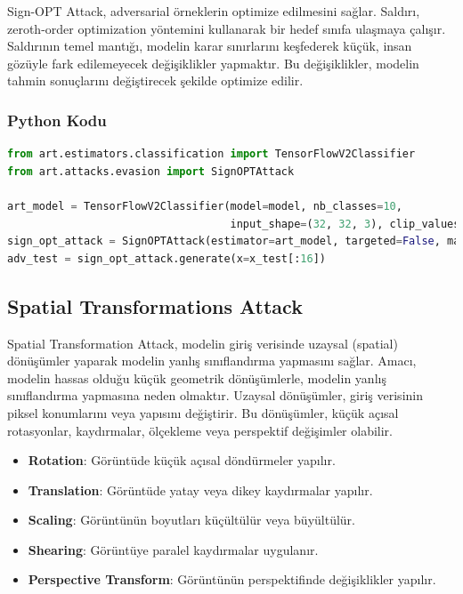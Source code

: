 Sign-OPT Attack, adversarial örneklerin optimize edilmesini sağlar. Saldırı, zeroth-order optimization yöntemini kullanarak bir hedef sınıfa ulaşmaya çalışır. Saldırının temel mantığı, modelin karar sınırlarını keşfederek küçük, insan gözüyle fark edilemeyecek değişiklikler yapmaktır. Bu değişiklikler, modelin tahmin sonuçlarını değiştirecek şekilde optimize edilir.

\subsubsection{Python Kodu}

\begin{lstlisting}[language=Python]
from art.estimators.classification import TensorFlowV2Classifier
from art.attacks.evasion import SignOPTAttack

art_model = TensorFlowV2Classifier(model=model, nb_classes=10, 
                                   input_shape=(32, 32, 3), clip_values=(0, 1))
sign_opt_attack = SignOPTAttack(estimator=art_model, targeted=False, max_iter=100, query_limit=2000)
adv_test = sign_opt_attack.generate(x=x_test[:16])
\end{lstlisting}

\newpage

\subsection{Spatial Transformations Attack}

Spatial Transformation Attack, modelin giriş verisinde uzaysal (spatial) dönüşümler yaparak modelin yanlış sınıflandırma yapmasını sağlar. Amacı, modelin hassas olduğu küçük geometrik dönüşümlerle, modelin yanlış sınıflandırma yapmasına neden olmaktır. Uzaysal dönüşümler, giriş verisinin piksel konumlarını veya yapısını değiştirir. Bu dönüşümler, küçük açısal rotasyonlar, kaydırmalar, ölçekleme veya perspektif değişimler olabilir.

\begin{itemize}
    \item \textbf{Rotation}: Görüntüde küçük açısal döndürmeler yapılır.
    \item \textbf{Translation}: Görüntüde yatay veya dikey kaydırmalar yapılır.
    \item \textbf{Scaling}: Görüntünün boyutları küçültülür veya büyültülür.
    \item \textbf{Shearing}: Görüntüye paralel kaydırmalar uygulanır.
    \item \textbf{Perspective Transform}: Görüntünün perspektifinde değişiklikler yapılır.
\end{itemize}

